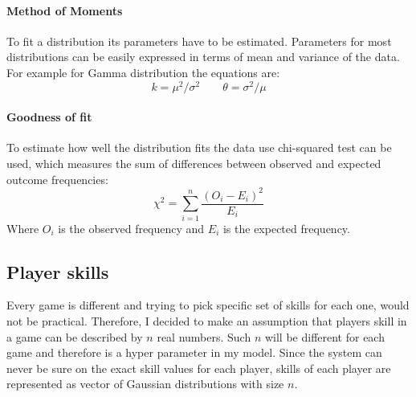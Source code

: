 \documentclass[12pt,a4paper]{book}
\begin{document}
\paragraph{Method of Moments}
To fit a distribution its parameters have to be estimated.
Parameters for most distributions can be easily expressed in terms of mean and variance of the data.
For example for Gamma distribution the equations are:
\begin{equation*}
k= \mu^2/\sigma^2
\qquad
\theta = \sigma^2/\mu
\end{equation*}
\paragraph{Goodness of fit}
To estimate how well the distribution fits the data use chi-squared test can be used, which measures the sum of differences between observed and expected outcome frequencies:
\begin{equation*}
\chi^2 = \sum_{i=1}^{n} \frac{(O_i - E_i)^2}{E_i}
\end{equation*}
Where $O_i$ is the observed frequency and $E_i$ is the expected frequency.
\subsection{Player skills}
Every game is different and trying to pick specific set of skills for each one, would not be practical.
Therefore, I decided to make an assumption that players skill in a game can be described by $n$ real numbers.
Such $n$ will be different for each game and therefore is a hyper parameter in my model.
Since the system can never be sure on the exact skill values for each player, skills of each player are represented as vector of Gaussian distributions with size $n$.
\end{document}
